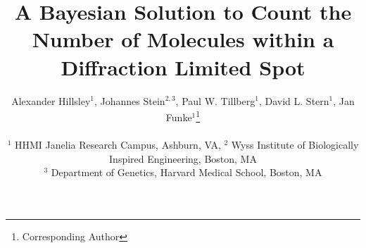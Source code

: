 \documentclass[twocolumn]{article}
\begin{document}
\title{A Bayesian Solution to Count the Number of Molecules within a Diffraction Limited Spot}

\author{
  Alexander Hillsley$^{1}$,
  Johannes Stein$^{2,3}$,
  Paul W. Tillberg$^{1}$,
  David L. Stern$^{1}$,
  Jan Funke$^{1}$\thanks{Corresponding Author}
  \\\\
  \normalsize{$^1$ HHMI Janelia Research Campus, Ashburn, VA},
  \normalsize{$^2$ Wyss Institute of Biologically Inspired Engineering, Boston, MA} \\
  \normalsize{$^3$ Department of Genetics, Harvard Medical School, Boston, MA}
  }

\maketitle











{
  \small
  
  
}

\clearpage
% 
\end{document}
